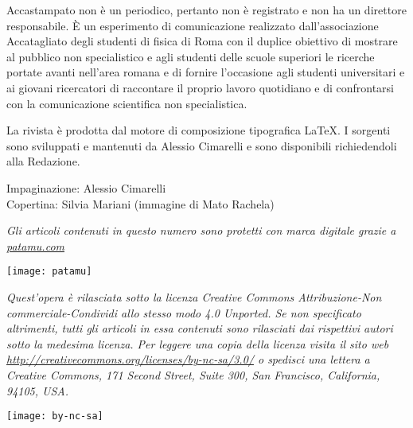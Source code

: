 Accastampato non è un periodico, pertanto non è registrato e non ha un direttore responsabile. 
È un esperimento di comunicazione realizzato dall'associazione Accatagliato degli studenti di fisica 
di Roma con il duplice obiettivo di mostrare al pubblico non specialistico e 
agli studenti delle scuole superiori le ricerche portate avanti nell'area romana e di fornire l'occasione agli studenti 
universitari e ai giovani ricercatori di raccontare il proprio lavoro quotidiano e di confrontarsi 
con la comunicazione scientifica non specialistica.

\bigskip
La rivista è prodotta dal motore di composizione tipografica \LaTeX.
I sorgenti sono sviluppati e mantenuti da Alessio Cimarelli e sono disponibili richiedendoli alla Redazione.

\bigskip
Impaginazione: Alessio Cimarelli\\
Copertina: Silvia Mariani (immagine di Mato Rachela)


\vspace{1cm}
\textit{Gli articoli contenuti in questo numero sono protetti con marca digitale grazie a \url{patamu.com}}
\begin{center}\texttt{[image: patamu]}\end{center}

\vspace{1cm}
\textit{Quest'opera è rilasciata sotto la licenza Creative Commons \emph{Attribuzione-Non commerciale-Condividi allo stesso modo}
4.0 Unported. Se non specificato altrimenti, tutti gli articoli in essa contenuti sono rilasciati dai rispettivi autori 
sotto la medesima licenza. Per leggere una copia della licenza visita il sito web
\url{http://creativecommons.org/licenses/by-nc-sa/3.0/} o spedisci una lettera a Creative Commons, 171 Second Street, 
Suite 300, San Francisco, California, 94105, USA.}
\begin{center}\texttt{[image: by-nc-sa]}\end{center}
\vspace{1.5cm}
